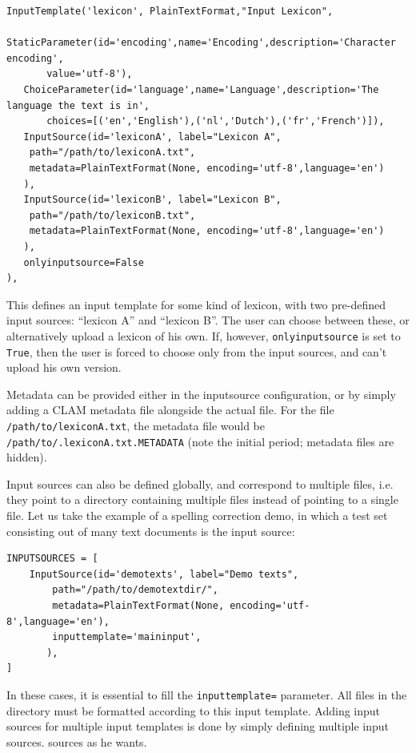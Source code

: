 \documentclass[a4paper,12pt]{report}
\begin{document}
\begin{verbatim}
InputTemplate('lexicon', PlainTextFormat,"Input Lexicon", 
   StaticParameter(id='encoding',name='Encoding',description='Character encoding',
       value='utf-8'),
   ChoiceParameter(id='language',name='Language',description='The language the text is in', 
       choices=[('en','English'),('nl','Dutch'),('fr','French')]),
   InputSource(id='lexiconA', label="Lexicon A",
    path="/path/to/lexiconA.txt", 
    metadata=PlainTextFormat(None, encoding='utf-8',language='en')
   ),
   InputSource(id='lexiconB', label="Lexicon B",
    path="/path/to/lexiconB.txt", 
    metadata=PlainTextFormat(None, encoding='utf-8',language='en')
   ),
   onlyinputsource=False
),            
\end{verbatim}

This defines an input template for some kind of lexicon, with two pre-defined
input sources: ``lexicon A'' and ``lexicon B''. The user can choose between
these, or alternatively upload a lexicon of his own. If, however,
\texttt{onlyinputsource} is set to \texttt{True}, then the user is forced to
choose only from the input sources, and can't upload his own version. 

Metadata can be provided either in the inputsource configuration, or by simply
adding a CLAM metadata file alongside the actual file. For the file
\texttt{/path/to/lexiconA.txt}, the metadata file would be
\texttt{/path/to/.lexiconA.txt.METADATA} (note the initial period; metadata
files are hidden). 

Input sources can also be defined globally, and correspond to multiple files,
i.e. they point to a directory containing multiple files instead of pointing to
a single file. Let us take the example of a spelling correction demo, in which
a test set consisting out of many text documents is the input source:

\begin{verbatim}
INPUTSOURCES = [
    InputSource(id='demotexts', label="Demo texts",
        path="/path/to/demotextdir/", 
        metadata=PlainTextFormat(None, encoding='utf-8',language='en'),
        inputtemplate='maininput',
       ),
]
\end{verbatim}

In these cases, it is essential to fill the \texttt{inputtemplate=} parameter.
All files in the directory must be formatted according to this input template.
Adding input sources for multiple input templates is done by simply defining
multiple input sources. %
sources as he wants.
\end{document}
